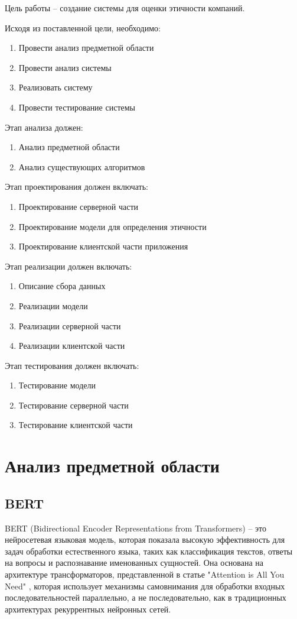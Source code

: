 \documentclass[PI, VKR]{HSEUniversity}
\begin{document}
Цель работы – создание системы для оценки этичности компаний.

Исходя из поставленной цели, необходимо:

\begin{enumerate}
\item Провести анализ предметной области
\item Провести анализ системы
\item Реализовать систему
\item Провести тестирование системы
\end{enumerate}

Этап анализа должен:
\begin{enumerate}
\item Анализ предметной области
\item Анализ существующих алгоритмов
\end{enumerate}

Этап проектирования должен включать:
\begin{enumerate}
\item Проектирование серверной части
\item Проектирование модели для определения этичности
\item Проектирование клиентской части приложения
\end{enumerate}

Этап реализации должен включать:
\begin{enumerate}
\item Описание сбора данных
\item Реализации модели
\item Реализации серверной части
\item Реализации клиентской части
\end{enumerate}

Этап тестирования должен включать:
\begin{enumerate}
\item Тестирование модели
\item Тестирование серверной части
\item Тестирование клиентской части
\end{enumerate}
\chapter{Анализ предметной области}
\label{sec:orgf0e2f86}
\section{BERT}
\label{sec:org3a1a545}
BERT \autocite{devlin2018bert} (Bidirectional Encoder Representations from Transformers) -- это нейросетевая языковая модель, которая показала высокую эффективность для задач обработки естественного языка, таких как классификация текстов, ответы на вопросы и распознавание именованных сущностей. Она основана на архитектуре трансформаторов, представленной в статье "Attention is All You Need" \autocite{NIPS2017_3f5ee243}, которая использует механизмы самовнимания для обработки входных последовательностей параллельно, а не последовательно, как в традиционных архитектурах рекуррентных нейронных сетей.
\end{document}
